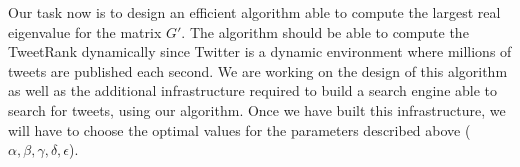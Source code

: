 \documentclass[12pt,a4paper]{article}
\begin{document}
Our task now is to design an efficient algorithm able to compute the largest real eigenvalue for the matrix $G'$. The algorithm should be able to compute the TweetRank dynamically since Twitter is a dynamic environment where millions of tweets are published each second. We are working on the design of this algorithm as well as the additional infrastructure required to build a search engine able to search for tweets, using our algorithm. Once we have built this infrastructure, we will have to choose the optimal values for the parameters described above ($\alpha, \beta, \gamma, \delta, \epsilon$).
\end{document}
